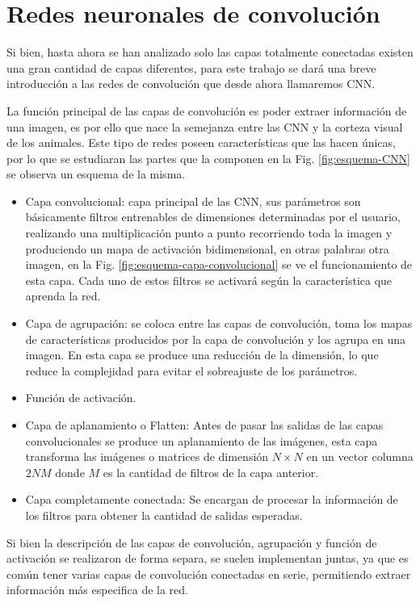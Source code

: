 \section{Redes neuronales de convolución}

Si bien, hasta ahora se han analizado solo las capas totalmente conectadas existen una gran cantidad de capas diferentes, para este trabajo se dará una breve introducción a las redes de convolución que desde ahora llamaremos CNN.

La función principal de las capas de convolución es poder extraer información de una imagen, es por ello que nace la semejanza entre las CNN y la corteza visual de los animales.
Este tipo de redes poseen características que las hacen únicas, por lo que se estudiaran las partes que la componen en la Fig. \ref{fig:esquema-CNN} se observa un esquema de la misma.
\begin{itemize}
    \item Capa convolucional: capa principal de las CNN, sus parámetros son básicamente filtros entrenables de dimensiones determinadas por el
          usuario, realizando una multiplicación punto a punto recorriendo toda la imagen y produciendo un mapa de activación bidimensional, en otras palabras otra imagen, en la
          Fig. \ref{fig:esquema-capa-convolucional} se ve el funcionamiento de esta capa. Cada uno de estos filtros se activará según la característica que aprenda la red.
    \item Capa de agrupación: se coloca entre las capas de convolución, toma los mapas de características producidos por la capa de
          convolución y los agrupa en una imagen. En esta capa se produce una reducción de la dimensión, lo que reduce la complejidad para evitar el sobreajuste de los parámetros.
    \item Función de activación.
    \item Capa de aplanamiento o Flatten: Antes de pasar las salidas de las capas convolucionales se produce un aplanamiento de las imágenes, esta capa transforma las imágenes o matrices de dimensión $N \times N$ en un vector columna $2NM$ donde $M$ es la cantidad de filtros de la capa anterior.
    \item Capa completamente conectada: Se encargan de procesar la información de los filtros para obtener la cantidad de salidas esperadas.
\end{itemize}

Si bien la descripción de las capas de convolución, agrupación y función de activación se realizaron de forma separa, se suelen implementan juntas, ya que es común tener varias capas de convolución conectadas en serie, permitiendo extraer información más especifica de la red.

